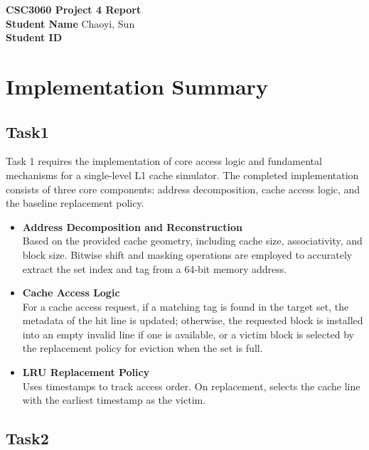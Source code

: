 \documentclass[11pt]{article}
\begin{document}
\begin{center}
    \centering
    {\Huge \textbf{CSC3060 Project 4 Report}} \\[0.5cm]
    
    \textbf{Student Name} \quad Chaoyi, Sun \\[0.1cm]
    \textbf{Student ID}  \\[1cm]
\end{center}

\section{Implementation Summary}
\subsection{Task1}

Task 1 requires the implementation of core access logic and fundamental mechanisms for a single-level L1 cache simulator. The completed implementation consists of three core components: address decomposition, cache access logic, and the baseline replacement policy.

\begin{itemize}
\item \textbf{Address Decomposition and Reconstruction} \\
Based on the provided cache geometry, including cache size, associativity, and block size. Bitwise shift and masking operations are employed to accurately extract the set index and tag from a 64-bit memory address.

\item\textbf{Cache Access Logic}\\
For a cache access request, if a matching tag is found in the target set, the metadata of the hit line is updated; otherwise, the requested block is installed into an empty invalid line if one is available, or a victim block is selected by the replacement policy for eviction when the set is full.

\item\textbf{LRU Replacement Policy} \\
Uses timestamps to track access order. On replacement, selects the cache line with the earliest timestamp as the victim.
\end{itemize}

\subsection{Task2}
\end{document}
